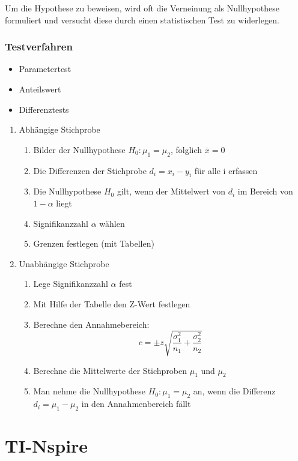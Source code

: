 \documentclass[11pt,twoside,landscape]{article}
\begin{document}
\begin{multicols}{3}
Um die Hypothese zu beweisen, wird oft die Verneinung als Nullhypothese formuliert und versucht diese durch einen statistischen Test zu widerlegen.

\subsubsection{Testverfahren}
\label{sec:orgd5eb79e}
\begin{itemize}
\item Parametertest
\item Anteilswert
\item Differenztests
\end{itemize}
\begin{enumerate}
\item Abhängige Stichprobe
\label{sec:org91af9bc}
\begin{enumerate}
\item Bilder der Nullhypothese \(H_0: \mu_1 = \mu_2\), folglich \(\overline{x} = 0\)
\item Die Differenzen der Stichprobe \(d_i = x_i - y_i\) für alle i erfassen
\item Die Nullhypothese \(H_0\) gilt, wenn der Mittelwert von \(d_i\) im Bereich von \(1-\alpha\) liegt
\item Signifikanzzahl \(\alpha\) wählen
\item Grenzen festlegen (mit Tabellen)
\end{enumerate}
\item Unabhängige Stichprobe
\label{sec:org86772e5}
\begin{enumerate}
\item Lege Signifikanzzahl \(\alpha\) fest
\item Mit Hilfe der Tabelle den Z-Wert festlegen
\item Berechne den Annahmebereich:
\begin{equation*}
  c = \pm z \sqrt{\frac{\sigma_1^2}{n_1}+\frac{\sigma_2^2}{n_2}}
\end{equation*}

\item Berechne die Mittelwerte der Stichproben \(\mu_1\) und \(\mu_2\)
\item Man nehme die Nullhypothese \(H_0: \mu_1 = \mu_2\) an, wenn die Differenz \(d_i = \mu_1 - \mu_2\) in den Annahmenbereich fällt
\end{enumerate}
\end{enumerate}


\section{TI-Nspire}
\label{sec:orga1d35b9}

\end{multicols}
\end{document}
